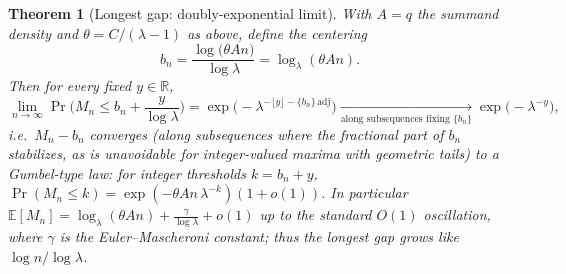 \documentclass[12pt]{article}
\newtheorem{theorem}{Theorem}
\theoremstyle{definition}
\newcommand{\E}{\mathbb{E}}
\newcommand{\R}{\mathbb{R}}
\begin{document}
\begin{theorem}[Longest gap: doubly-exponential limit]\label{thm:longest}
With $A=q$ the summand density and $\theta=C/(\lambda-1)$ as above, define the
centering
\begin{equation}\label{eq:bn}
b_n=\frac{\log\!\big(\theta A n\big)}{\log\lambda}=\log_\lambda(\theta A n).
\end{equation}
Then for every fixed $y\in\R$,
\begin{equation}\label{eq:gumbel}
\lim_{n\to\infty}\Pr\!\Big(M_n\le b_n+\frac{y}{\log\lambda}\Big)
=\exp\!\big(-\lambda^{-\lfloor y\rfloor-\{b_n\}\,\mathrm{adj}}\big)
\xrightarrow[\text{along subsequences fixing }\{b_n\}]{}
\exp\!\big(-\lambda^{-y}\big),
\end{equation}
i.e.\ $M_n-b_n$ converges (along subsequences where the fractional part of $b_n$
stabilizes, as is unavoidable for integer-valued maxima with geometric tails) to
a Gumbel-type law: for integer thresholds $k=b_n+y$,
$\Pr(M_n\le k)=\exp(-\theta A n\,\lambda^{-k})(1+o(1))$. In particular
$\E[M_n]=\log_\lambda(\theta A n)+\frac{\gamma}{\log\lambda}+o(1)$ up to the
standard $O(1)$ oscillation, where $\gamma$ is the Euler--Mascheroni constant;
thus the longest gap grows like $\log n/\log\lambda$.
\end{theorem}
\end{document}
